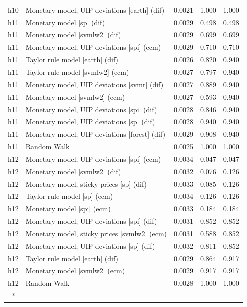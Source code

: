 \begin{ThreePartTable}
\begin{longtable}[t]{cp{5.5cm}ccc}
h10 & \raggedright Monetary model, UIP deviations [earth] (dif) & 0.0021 & 1.000 & 1.000\\
\addlinespace
h11 & \raggedright Monetary model [sp] (dif) & 0.0029 & 0.498 & 0.498\\
h11 & \raggedright Monetary model [svmlw2] (dif) & 0.0029 & 0.699 & 0.699\\
h11 & \raggedright Monetary model, UIP deviations [spi] (ecm) & 0.0029 & 0.710 & 0.710\\
h11 & \raggedright Taylor rule model [earth] (dif) & 0.0026 & 0.820 & 0.940\\
h11 & \raggedright Taylor rule model [svmlw2] (ecm) & 0.0027 & 0.797 & 0.940\\
h11 & \raggedright Monetary model, UIP deviations [svmr] (dif) & 0.0027 & 0.889 & 0.940\\
h11 & \raggedright Monetary model [svmlw2] (ecm) & 0.0027 & 0.593 & 0.940\\
h11 & \raggedright Monetary model, UIP deviations [spi] (dif) & 0.0028 & 0.846 & 0.940\\
h11 & \raggedright Monetary model, UIP deviations [sp] (dif) & 0.0028 & 0.940 & 0.940\\
h11 & \raggedright Monetary model, UIP deviations [forest] (dif) & 0.0029 & 0.908 & 0.940\\
h11 & \raggedright Random Walk & 0.0025 & 1.000 & 1.000\\
\addlinespace
h12 & \raggedright Monetary model, UIP deviations [spi] (ecm) & 0.0034 & 0.047 & 0.047\\
h12 & \raggedright Monetary model [svmlw2] (dif) & 0.0032 & 0.076 & 0.126\\
h12 & \raggedright Monetary model, sticky prices [sp] (dif) & 0.0033 & 0.085 & 0.126\\
h12 & \raggedright Taylor rule model [sp] (ecm) & 0.0034 & 0.126 & 0.126\\
h12 & \raggedright Monetary model [spi] (ecm) & 0.0033 & 0.184 & 0.184\\
h12 & \raggedright Monetary model, UIP deviations [spi] (dif) & 0.0031 & 0.852 & 0.852\\
h12 & \raggedright Monetary model, sticky prices [svmlw2] (ecm) & 0.0031 & 0.588 & 0.852\\
h12 & \raggedright Monetary model, UIP deviations [sp] (dif) & 0.0032 & 0.811 & 0.852\\
h12 & \raggedright Taylor rule model [earth] (dif) & 0.0029 & 0.864 & 0.917\\
h12 & \raggedright Monetary model [svmlw2] (ecm) & 0.0029 & 0.917 & 0.917\\
h12 & \raggedright Random Walk & 0.0028 & 1.000 & 1.000\\*
\end{longtable}
\end{ThreePartTable}
\endgroup{}
